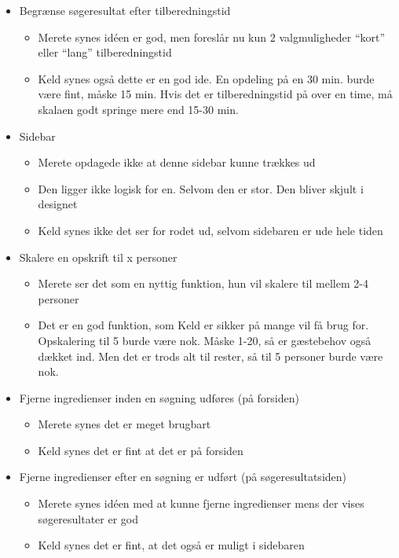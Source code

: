 \begin{description}
\begin{itemize}[noitemsep]
\item Begrænse søgeresultat efter tilberedningstid
\begin{itemize}[noitemsep]
\item Merete synes idéen er god, men foreslår nu kun 2 valgmuligheder ``kort'' eller ``lang'' tilberedningstid
\item Keld synes også dette er en god ide. En opdeling på en 30 min. burde være fint, måske 15 min. Hvis det er tilberedningstid på over en time, må skalaen godt springe mere end 15-30 min.
\end{itemize}
\item Sidebar
\begin{itemize}[noitemsep]
\item Merete opdagede ikke at denne sidebar kunne trækkes ud
\item Den ligger ikke logisk for en. Selvom den er stor. Den bliver skjult i designet
\item Keld synes ikke det ser for rodet ud, selvom sidebaren er ude hele tiden
\end{itemize}
\item Skalere en opskrift til x personer
\begin{itemize}[noitemsep]
\item Merete ser det som en nyttig funktion, hun vil skalere til mellem 2-4 personer
\item Det er en god funktion, som Keld er sikker på mange vil få brug for. Opskalering til 5 burde være nok. Måske 1-20, så er gæstebehov også dækket ind. Men det er trods alt til rester, så til 5 personer burde være nok.
\end{itemize}
\item Fjerne ingredienser inden en søgning udføres (på forsiden)
\begin{itemize}[noitemsep]
\item Merete synes det er meget brugbart
\item Keld synes det er fint at det er på forsiden
\end{itemize}
\item Fjerne ingredienser efter en søgning er udført (på søgeresultatsiden)
\begin{itemize}[noitemsep]
\item Merete synes idéen med at kunne fjerne ingredienser mens der vises søgeresultater er god
\item Keld synes det er fint, at det også er muligt i sidebaren
\end{itemize}

\end{itemize}
\end{description}
